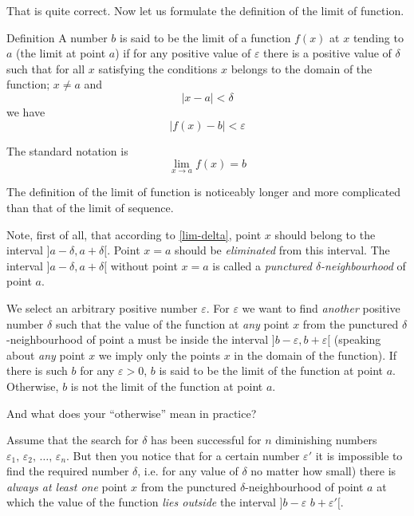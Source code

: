 {\athr That is quite correct. Now let us formulate the definition of the limit of function.
\begin{mytheo}{Definition}
A number $b$ is said to be the limit of a function $f (x)$ at $x$ tending to $a$ (the limit at point $a$) if for any positive value of $\varepsilon$ there is a positive value of $\delta$ such that for all $x$ satisfying the conditions $x$ belongs to the domain of the function; $x \neq a$ and 
\begin{equation}%
|x- a| < \delta
\label{lim-delta}
\end{equation}
we have
\begin{equation}%
\left|f(x)- b \right| < \varepsilon
\label{lim-eps}
\end{equation}
\end{mytheo}
The standard notation is
\begin{equation*}%
\lim\limits_{x \to a} f (x) = b
\end{equation*}

\rdr The definition of the limit of function is noticeably longer and more complicated than that of the limit of sequence.

\athr Note, first of all, that according to \eqref{lim-delta}, point $x$ should	belong	to	the	interval	 $]a -\delta,	a + \delta[$. Point $x = a$ should be \emph{eliminated} from this interval. The interval $]a -\delta,	a + \delta[$ without point $x = a$ is called a \emph{punctured $\delta$-neighbourhood} of point $a$.

We select an arbitrary positive number $\varepsilon$. For $\varepsilon$ we want to find \emph{another} positive number $\delta$ such that the value of the function at \emph{any} point $x$ from the punctured $
\delta$-neighbourhood of point a must be inside the interval  $]b -\varepsilon,	b + \varepsilon [$ (speaking about \emph{any} point $x$ we imply only the points $x$ in the domain of the function). If there is such $b$ for any $\varepsilon > 0$, $b$ is said to be the limit of the function at point $a$. Otherwise, $b$ is not the limit of the function at point $a$.

\rdr And what does your ``otherwise'' mean in practice?

\athr Assume that the search for $\delta$ has been successful for $n$ diminishing numbers $\varepsilon_{1}, \, \varepsilon_{2}, \, \ldots, \, \varepsilon_{n}$. But then you notice that for a certain number $\varepsilon'$ it is impossible to find the required number $\delta$, i.e. for any value of $\delta$ no matter
how small) there is \emph{always at least one} point $x$ from the punctured $\delta$-neighbourhood of point $a$ at which the value of the function \emph{lies outside} the interval $]b -\varepsilon\,	\, b + \varepsilon' [$.

}

